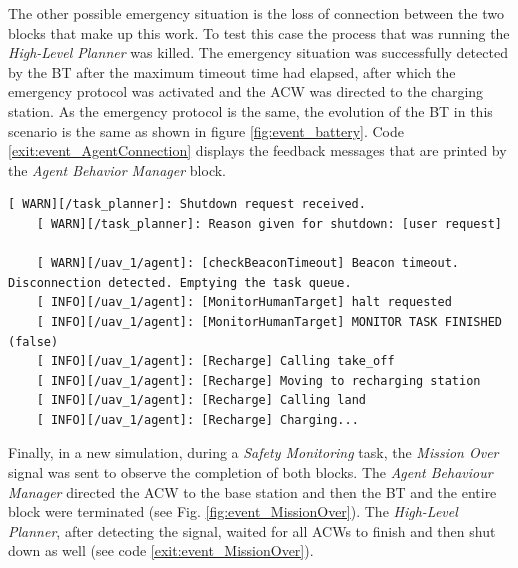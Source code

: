 The other possible emergency situation is the loss of connection between the two blocks that make up this work. To test this case the process that was running the \emph{High-Level Planner} was killed. The emergency situation was successfully detected by the \gls{BT} after the maximum timeout time had elapsed, after which the emergency protocol was activated and the \gls{ACW} was directed to the charging station. As the emergency protocol is the same, the evolution of the \gls{BT} in this scenario is the same as shown in figure \ref{fig:event_battery}. Code \ref{exit:event_AgentConnection} displays the feedback messages that are printed by the \emph{Agent Behavior Manager} block.

\begin{lstlisting}[caption={Feedback messages printed by the \emph{Agent Behavior Manager} block after a connection loss}, breaklines=true, label=exit:event_AgentConnection]
    [ WARN][/task_planner]: Shutdown request received.
    [ WARN][/task_planner]: Reason given for shutdown: [user request]
    
    [ WARN][/uav_1/agent]: [checkBeaconTimeout] Beacon timeout. Disconnection detected. Emptying the task queue.
    [ INFO][/uav_1/agent]: [MonitorHumanTarget] halt requested
    [ INFO][/uav_1/agent]: [MonitorHumanTarget] MONITOR TASK FINISHED (false)
    [ INFO][/uav_1/agent]: [Recharge] Calling take_off
    [ INFO][/uav_1/agent]: [Recharge] Moving to recharging station
    [ INFO][/uav_1/agent]: [Recharge] Calling land
    [ INFO][/uav_1/agent]: [Recharge] Charging...
\end{lstlisting}

Finally, in a new simulation, during a \emph{Safety Monitoring} task, the \emph{Mission Over} signal was sent to observe the completion of both blocks. The \emph{Agent Behaviour Manager} directed the \gls{ACW} to the base station and then the \gls{BT} and the entire block were terminated (see Fig. \ref{fig:event_MissionOver}). The \emph{High-Level Planner}, after detecting the signal, waited for all \glspl{ACW} to finish and then shut down as well (see code \ref{exit:event_MissionOver}).

